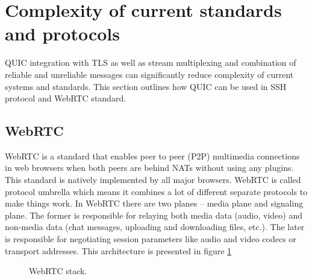 \section{Complexity of current standards and protocols}
\label{sec:complexity_of_current_standards_and_protocols}
QUIC integration with TLS as well as stream multiplexing and combination of reliable and unreliable messages can significantly reduce complexity of current systems and standards.
This section outlines how QUIC can be used in SSH protocol and WebRTC standard.
\subsection{WebRTC}
WebRTC is a standard that enables peer to peer (P2P) multimedia connections in web browsers when both peers are behind NATs without using any plugins.
This standard is natively implemented by all major browsers.
WebRTC is called protocol umbrella which means it combines a lot of different separate protocols to make things work.
In WebRTC there are two planes -- media plane and signaling plane.
The former is responsible for relaying both media data (audio, video) and non-media data (chat messages, uploading and downloading files, etc.).
The later is responsible for negotiating session parameters like audio and video codecs or transport addresses.
This architecture is presented in figure \ref{fig:webrtc-stack}

\begin{figure}[h]
    \centering
    \label{fig:webrtc-stack}
    \caption{WebRTC stack.}
\end{figure}


